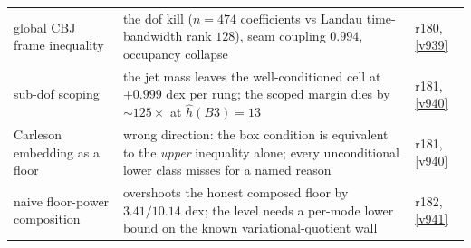 \begin{center}
\begin{tabularx}{\linewidth}{@{}>{\hsize=0.62\hsize\raggedright\arraybackslash}X>{\hsize=1.08\hsize\raggedright\arraybackslash}X>{\hsize=0.30\hsize\raggedright\arraybackslash}X@{}}
global CBJ frame inequality & the dof kill ($n = 474$ coefficients vs Landau time-bandwidth rank $128$), seam coupling $0.994$, occupancy collapse & r180, \vref{v939} \\
sub-dof scoping & the jet mass leaves the well-conditioned cell at $+0.999$ dex per rung; the scoped margin dies by ${\sim}125\times$ at $\hat h(B3) = 13$ & r181, \vref{v940} \\
Carleson embedding as a floor & wrong direction: the box condition is equivalent to the \emph{upper} inequality alone; every unconditional lower class misses for a named reason & r181, \vref{v940} \\
naive floor-power composition & overshoots the honest composed floor by $3.41/10.14$ dex; the level needs a per-mode lower bound on the known variational-quotient wall & r182, \vref{v941} \\
\bottomrule
\end{tabularx}
\end{center}


